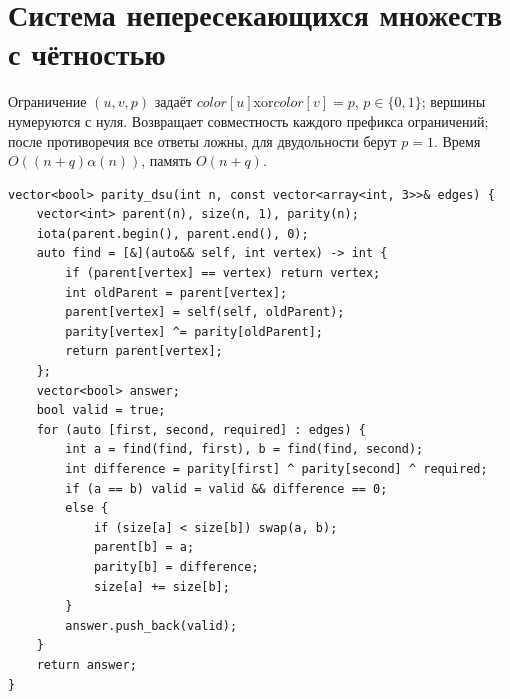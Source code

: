 \section{Система непересекающихся множеств с чётностью}
Ограничение $(u,v,p)$ задаёт $color[u]\mathbin{\mathrm{xor}}color[v]=p$, $p\in\{0,1\}$; вершины нумеруются с нуля.
Возвращает совместность каждого префикса ограничений; после противоречия все ответы ложны, для двудольности берут $p=1$.
Время $O((n+q)\alpha(n))$, память $O(n+q)$.
\begin{lstlisting}[name=parity_dsu]
vector<bool> parity_dsu(int n, const vector<array<int, 3>>& edges) {
    vector<int> parent(n), size(n, 1), parity(n);
    iota(parent.begin(), parent.end(), 0);
    auto find = [&](auto&& self, int vertex) -> int {
        if (parent[vertex] == vertex) return vertex;
        int oldParent = parent[vertex];
        parent[vertex] = self(self, oldParent);
        parity[vertex] ^= parity[oldParent];
        return parent[vertex];
    };
    vector<bool> answer;
    bool valid = true;
    for (auto [first, second, required] : edges) {
        int a = find(find, first), b = find(find, second);
        int difference = parity[first] ^ parity[second] ^ required;
        if (a == b) valid = valid && difference == 0;
        else {
            if (size[a] < size[b]) swap(a, b);
            parent[b] = a;
            parity[b] = difference;
            size[a] += size[b];
        }
        answer.push_back(valid);
    }
    return answer;
}
\end{lstlisting}
%


